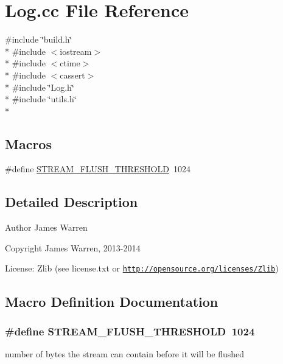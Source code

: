 \section{Log.\-cc File Reference}
\label{_log_8cc}
{\ttfamily \#include \char`\"{}build.\-h\char`\"{}}\\*
{\ttfamily \#include $<$iostream$>$}\\*
{\ttfamily \#include $<$ctime$>$}\\*
{\ttfamily \#include $<$cassert$>$}\\*
{\ttfamily \#include \char`\"{}Log.\-h\char`\"{}}\\*
{\ttfamily \#include \char`\"{}utils.\-h\char`\"{}}\\*
\subsection*{Macros}
\begin{DoxyCompactItemize}
\item 
\#define \hyperlink{_log_8cc_ac426b5996d5dd5f65bffb41074abe198}{S\-T\-R\-E\-A\-M\-\_\-\-F\-L\-U\-S\-H\-\_\-\-T\-H\-R\-E\-S\-H\-O\-L\-D}~1024
\end{DoxyCompactItemize}


\subsection{Detailed Description}
\begin{DoxyAuthor}{Author}
James Warren 
\end{DoxyAuthor}
\begin{DoxyCopyright}{Copyright}
James Warren, 2013-\/2014 
\end{DoxyCopyright}
\begin{DoxyParagraph}{License\-:}
Zlib (see license.\-txt or \href{http://opensource.org/licenses/Zlib}{\tt http\-://opensource.\-org/licenses/\-Zlib}) 
\end{DoxyParagraph}


\subsection{Macro Definition Documentation}
\subsubsection[{S\-T\-R\-E\-A\-M\-\_\-\-F\-L\-U\-S\-H\-\_\-\-T\-H\-R\-E\-S\-H\-O\-L\-D}]{\setlength{\rightskip}{0pt plus 5cm}\#define S\-T\-R\-E\-A\-M\-\_\-\-F\-L\-U\-S\-H\-\_\-\-T\-H\-R\-E\-S\-H\-O\-L\-D~1024}\label{_log_8cc_ac426b5996d5dd5f65bffb41074abe198}
number of bytes the stream can contain before it will be flushed 